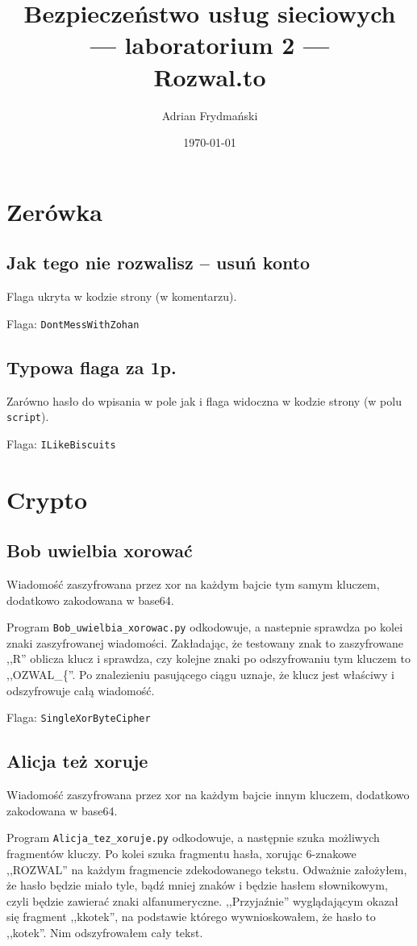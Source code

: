 \documentclass[a4paper]{article}
\title{Bezpieczeństwo usług sieciowych \\ --- laboratorium 2 --- \\ Rozwal.to}
\author{Adrian Frydmański}
\date{\today}
\begin{document}
\maketitle

\section{Zerówka}
\subsection{Jak tego nie rozwalisz -- usuń konto}
Flaga ukryta w kodzie strony (w komentarzu).

Flaga: \texttt{DontMessWithZohan}

\subsection{Typowa flaga za 1p.}
Zarówno hasło do wpisania w pole jak i flaga widoczna w kodzie strony (w polu \texttt{script}).

Flaga: \texttt{ILikeBiscuits}


\section{Crypto}
\subsection{Bob uwielbia xorować}
Wiadomość zaszyfrowana przez xor na każdym bajcie tym samym kluczem, dodatkowo zakodowana w base64.

Program \texttt{Bob\_uwielbia\_xorowac.py} odkodowuje, a nastepnie sprawdza po kolei znaki zaszyfrowanej wiadomości. Zakładając, że testowany znak to zaszyfrowane ,,R'' oblicza klucz i sprawdza, czy kolejne znaki po odszyfrowaniu tym kluczem to ,,OZWAL\_\{''. Po znalezieniu pasującego ciągu uznaje, że klucz jest właściwy i odszyfrowuje całą wiadomość.

Flaga: \texttt{SingleXorByteCipher}


\subsection{Alicja też xoruje}
Wiadomość zaszyfrowana przez xor na każdym bajcie innym kluczem, dodatkowo zakodowana w base64. 

Program \texttt{Alicja\_tez\_xoruje.py} odkodowuje,
a następnie szuka możliwych fragmentów kluczy. Po kolei szuka fragmentu hasła, xorując 6-znakowe ,,ROZWAL'' na każdym fragmencie zdekodowanego tekstu. Odważnie założyłem, że hasło będzie miało tyle, bądź mniej znaków i będzie hasłem słownikowym, czyli będzie zawierać znaki alfanumeryczne. ,,Przyjaźnie'' wyglądającym okazał się fragment ,,kkotek'', na podstawie którego wywnioskowałem, że hasło to ,,kotek''. Nim odszyfrowałem cały tekst. 
\end{document}
